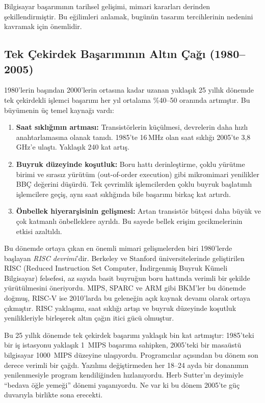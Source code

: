 Bilgisayar başarımının tarihsel gelişimi, mimari kararları derinden şekillendirmiştir. Bu eğilimleri anlamak, bugünün tasarım tercihlerinin nedenini kavramak için önemlidir.

\subsection{Tek Çekirdek Başarımının Altın Çağı (1980--2005)}
\label{subsec:altin-cag}

1980'lerin başından 2000'lerin ortasına kadar uzanan yaklaşık 25 yıllık dönemde tek çekirdekli işlemci başarımı her yıl ortalama \%40--50 oranında artmıştır. Bu büyümenin üç temel kaynağı vardı:

\begin{enumerate}
    \item \textbf{Saat sıklığının artması:} Transistörlerin küçülmesi, devrelerin daha hızlı anahtarlamasına olanak tanıdı. 1985'te 16\,MHz olan saat sıklığı 2005'te 3,8\,GHz'e ulaştı. Yaklaşık 240 kat artış.

    \item \textbf{Buyruk düzeyinde koşutluk:} Boru hattı derinleştirme, çoklu yürütme birimi ve sırasız yürütüm (out-of-order execution) gibi mikromimari yenilikler BBÇ değerini düşürdü. Tek çevrimlik işlemcilerden çoklu buyruk başlatımlı işlemcilere geçiş, aynı saat sıklığında bile başarımı birkaç kat artırdı.

    \item \textbf{Önbellek hiyerarşisinin gelişmesi:} Artan transistör bütçesi daha büyük ve çok katmanlı önbelleklere ayrıldı. Bu sayede bellek erişim gecikmelerinin etkisi azaltıldı.
\end{enumerate}

Bu dönemde ortaya çıkan en önemli mimari gelişmelerden biri 1980'lerde başlayan \emph{RISC devrimi}'dir. Berkeley ve Stanford üniversitelerinde geliştirilen RISC (Reduced Instruction Set Computer, İndirgenmiş Buyruk Kümeli Bilgisayar) felsefesi, az sayıda basit buyruğun boru hattında verimli bir şekilde yürütülmesini öneriyordu. MIPS, SPARC ve ARM gibi BKM'ler bu dönemde doğmuş, RISC-V ise 2010'larda bu geleneğin açık kaynak devamı olarak ortaya çıkmıştır. RISC yaklaşımı, saat sıklığı artışı ve buyruk düzeyinde koşutluk yenilikleriyle birleşerek altın çağın itici gücü olmuştur.

Bu 25 yıllık dönemde tek çekirdek başarımı yaklaşık bin kat artmıştır: 1985'teki bir iş istasyonu yaklaşık 1~MIPS başarıma sahipken, 2005'teki bir masaüstü bilgisayar 1000~MIPS düzeyine ulaşıyordu. Programcılar açısından bu dönem son derece verimli bir çağdı. Yazılımı değiştirmeden her 18--24 ayda bir donanımın yenilenmesiyle program kendiliğinden hızlanıyordu. Herb Sutter'ın deyimiyle ``bedava öğle yemeği'' dönemi yaşanıyordu. Ne var ki bu dönem 2005'te güç duvarıyla birlikte sona erecekti.

